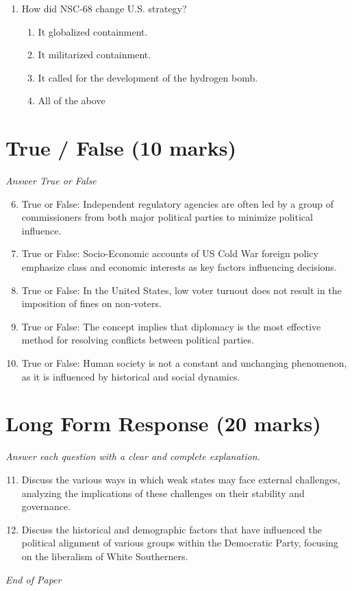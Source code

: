 \documentclass[12pt]{article}
\begin{document}
\begin{enumerate}[label=\arabic*.]
\begin{enumerate}[label=(\alph*)]
    \item judicial restraint
    \item ex post facto lawmaking
\end{enumerate}
\item How did NSC-68 change U.S. strategy?
\begin{enumerate}[label=(\alph*)]
    \item It globalized containment.
    \item It militarized containment.
    \item It called for the development of the hydrogen bomb.
    \item All of the above
\end{enumerate}
\end{enumerate}

\section*{True / False (10 marks)}
\textit{Answer True or False}
\begin{enumerate}[label=\arabic*.]
\setcounter{enumi}{5}
\item True or False: Independent regulatory agencies are often led by a group of commissioners from both major political parties to minimize political influence.
\item True or False: Socio-Economic accounts of US Cold War foreign policy emphasize class and economic interests as key factors influencing decisions.
\item True or False: In the United States, low voter turnout does not result in the imposition of fines on non-voters.
\item True or False: The concept implies that diplomacy is the most effective method for resolving conflicts between political parties.
\item True or False: Human society is not a constant and unchanging phenomenon, as it is influenced by historical and social dynamics.
\end{enumerate}

\section*{Long Form Response (20 marks)}
\textit{Answer each question with a clear and complete explanation.}
\begin{enumerate}[label=\arabic*.]
\setcounter{enumi}{10}
\item Discuss the various ways in which weak states may face external challenges, analyzing the implications of these challenges on their stability and governance.
\item Discuss the historical and demographic factors that have influenced the political alignment of various groups within the Democratic Party, focusing on the liberalism of White Southerners.
\end{enumerate}

\vfill
\noindent\textit{End of Paper}
\end{document}
